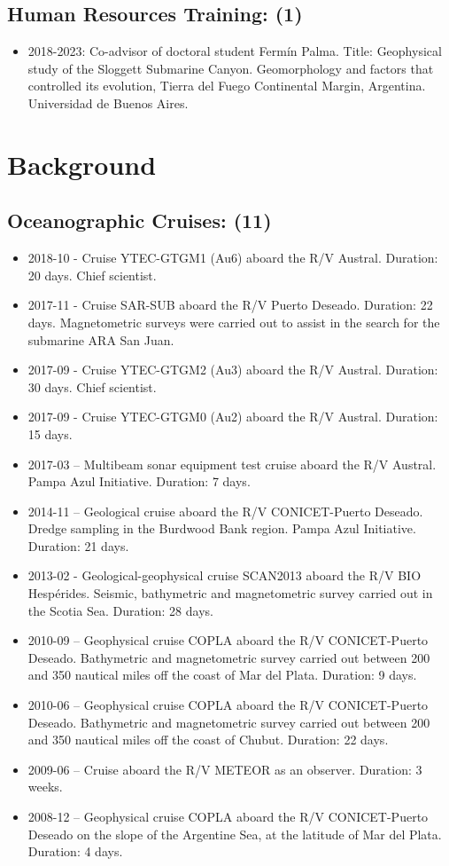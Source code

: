 \documentclass[11pt, a4paper]{article}
\begin{document}
\subsection{Human Resources Training: (1)}

\begin{itemize}
  \item 2018-2023: Co-advisor of doctoral student Fermín Palma. Title: Geophysical study of the Sloggett Submarine Canyon. Geomorphology and factors that controlled its evolution, Tierra del Fuego Continental Margin, Argentina. Universidad de Buenos Aires.
\end{itemize}

\section{Background}

\subsection{Oceanographic Cruises: (11)}

\begin{itemize}
  \item 2018-10 - Cruise YTEC-GTGM1 (Au6) aboard the R/V Austral. Duration: 20 days. Chief scientist.
  \item 2017-11 - Cruise SAR-SUB aboard the R/V Puerto Deseado. Duration: 22 days. Magnetometric surveys were carried out to assist in the search for the submarine ARA San Juan.
  \item 2017-09 - Cruise YTEC-GTGM2 (Au3) aboard the R/V Austral. Duration: 30 days. Chief scientist.
  \item 2017-09 - Cruise YTEC-GTGM0 (Au2) aboard the R/V Austral. Duration: 15 days.
  \item 2017-03 – Multibeam sonar equipment test cruise aboard the R/V Austral. Pampa Azul Initiative. Duration: 7 days.
  \item 2014-11 – Geological cruise aboard the R/V CONICET-Puerto Deseado. Dredge sampling in the Burdwood Bank region. Pampa Azul Initiative. Duration: 21 days.
  \item 2013-02 - Geological-geophysical cruise SCAN2013 aboard the R/V BIO Hespérides. Seismic, bathymetric and magnetometric survey carried out in the Scotia Sea. Duration: 28 days.
  \item 2010-09 – Geophysical cruise COPLA aboard the R/V CONICET-Puerto Deseado. Bathymetric and magnetometric survey carried out between 200 and 350 nautical miles off the coast of Mar del Plata. Duration: 9 days.
  \item 2010-06 – Geophysical cruise COPLA aboard the R/V CONICET-Puerto Deseado. Bathymetric and magnetometric survey carried out between 200 and 350 nautical miles off the coast of Chubut. Duration: 22 days.
  \item 2009-06 – Cruise aboard the R/V METEOR as an observer. Duration: 3 weeks.
  \item 2008-12 – Geophysical cruise COPLA aboard the R/V CONICET-Puerto Deseado on the slope of the Argentine Sea, at the latitude of Mar del Plata. Duration: 4 days.
\end{itemize}
\end{document}

